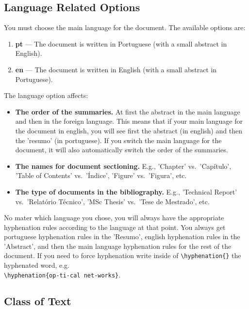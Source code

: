   
	
\subsection{Language Related Options} %
\label{sub:language_related_options}

You must choose the main language for the document. The available options are:

\begin{enumerate}
	\item \textbf{pt} --- The document is written in Portuguese (with a small abstract in English).
	\item \textbf{en} --- The document is written in English (with a small abstract in Portuguese).
\end{enumerate}

The language option affects:
\begin{itemize}
	\item \textbf{The order of the summaries.} At first the abstract in the main language and then in the foreign language. This means that if your main language for the document in english, you will see first the abstract (in english) and then the 'resumo' (in portuguese). If you switch the main language for the document, it will also automatically switch the order of the summaries.
	\item \textbf{The names for document sectioning.} E.g., 'Chapter' vs.\ 'Capítulo', 'Table of Contents' vs.\ 'Índice', 'Figure' vs.\ 'Figura', etc.
	\item \textbf{The type of documents in the bibliography.} E.g., 'Technical Report' vs.\ 'Relatório Técnico', 'MSc Thesis' vs.\ 'Tese de Mestrado', etc.
\end{itemize} 

No mater which language you chose, you will always have the appropriate hyphenation rules according to the language at that point. You always get portuguese hyphenation rules in the 'Resumo', english hyphenation rules in the 'Abstract', and then the main language hyphenation rules for the rest of the document. If you need to force hyphenation write inside of \verb!\hyphenation{}! the hyphenated word, e.g. \\
\verb!\hyphenation{op-ti-cal net-works}!.

\subsection{Class of Text} %
\label{sub:class_of_text}

